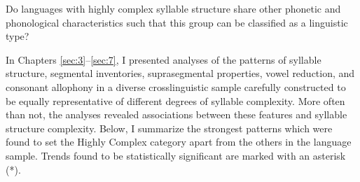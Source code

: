 \ea\label{ex:8.1}
   {Do languages with highly complex syllable structure share other phonetic and phonological characteristics such that this group can be classified as a linguistic type?}
\z

  In Chapters \ref{sec:3}--\ref{sec:7}, I presented analyses of the patterns of syllable structure, segmental inventories, suprasegmental properties, vowel reduction, and consonant allophony in a diverse crosslinguistic sample carefully constructed to be equally representative of different degrees of syllable complexity. More often than not, the analyses revealed associations between these features and syllable structure complexity. Below, I summarize the strongest patterns which were found to set the Highly Complex category apart from the others in the language sample. Trends found to be statistically significant are marked with an asterisk (*).

